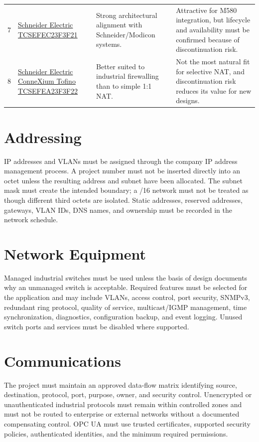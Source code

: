 \begin{longtable}{@{}P{0.60cm}P{3.40cm}P{5.41cm}P{5.80cm}@{}}
7 & \href{https://www.se.com/ww/en/product/TCSEFEC23F3F21/}{Schneider Electric TCSEFEC23F3F21} & Strong architectural alignment with Schneider/Modicon systems. & Attractive for M580 integration, but lifecycle and availability must be confirmed because of discontinuation risk. \\
8 & \href{https://www.se.com/ww/en/product/TCSEFEA23F3F22/}{Schneider Electric ConneXium Tofino TCSEFEA23F3F22} & Better suited to industrial firewalling than to simple 1:1 NAT. & Not the most natural fit for selective NAT, and discontinuation risk reduces its value for new designs. \\
\bottomrule
\end{longtable}

\section{Addressing}
IP addresses and VLANs must be assigned through the company IP address management process. A project number must not be inserted directly into an octet unless the resulting address and subnet have been allocated. The subnet mask must create the intended boundary; a /16 network must not be treated as though different third octets are isolated. Static addresses, reserved addresses, gateways, VLAN IDs, DNS names, and ownership must be recorded in the network schedule.

\section{Network Equipment}
Managed industrial switches must be used unless the basis of design documents why an unmanaged switch is acceptable. Required features must be selected for the application and may include VLANs, access control, port security, SNMPv3, redundant ring protocol, quality of service, multicast/IGMP management, time synchronization, diagnostics, configuration backup, and event logging. Unused switch ports and services must be disabled where supported.

\section{Communications}
The project must maintain an approved data-flow matrix identifying source, destination, protocol, port, purpose, owner, and security control. Unencrypted or unauthenticated industrial protocols must remain within controlled zones and must not be routed to enterprise or external networks without a documented compensating control. OPC UA must use trusted certificates, supported security policies, authenticated identities, and the minimum required permissions.

